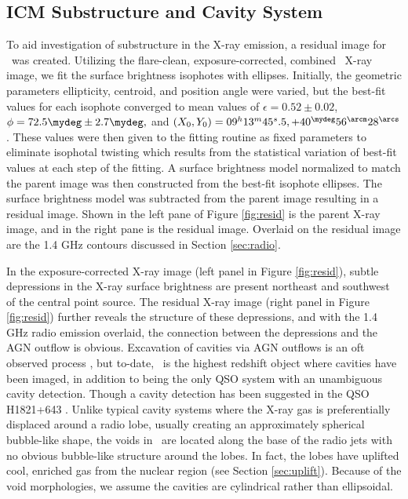 \documentclass{emulateapj}
\begin{document}
\subsection{ICM Substructure and Cavity System}
\label{sec:cavs}

To aid investigation of substructure in the X-ray emission, a residual
image for \iras\ was created. Utilizing the flare-clean,
exposure-corrected, combined \chandra\ X-ray image, we fit the surface
brightness isophotes with ellipses. Initially, the geometric
parameters ellipticity, centroid, and position angle were varied, but
the best-fit values for each isophote converged to mean values of
$\epsilon = 0.52 \pm 0.02$, $\phi = 72.5\mydeg \pm 2.7\mydeg,$ and
$(X_0,Y_0) = \ellradec$. These values were then given to the fitting
routine as fixed parameters to eliminate isophotal twisting which
results from the statistical variation of best-fit values at each step
of the fitting. A surface brightness model normalized to match the
parent image was then constructed from the best-fit isophote
ellipses. The surface brightness model was subtracted from the parent
image resulting in a residual image. Shown in the left pane of Figure
\ref{fig:resid} is the parent X-ray image, and in the right pane is
the residual image. Overlaid on the residual image are the 1.4 GHz
contours discussed in Section \ref{sec:radio}.

In the exposure-corrected X-ray image (left panel in Figure
\ref{fig:resid}), subtle depressions in the X-ray surface brightness
are present northeast and southwest of the central point source. The
residual X-ray image (right panel in Figure \ref{fig:resid}) further
reveals the structure of these depressions, and with the 1.4 GHz radio
emission overlaid, the connection between the depressions and the AGN
outflow is obvious. Excavation of cavities via AGN outflows is an oft
observed process \citep[\eg][]{perseus1, schindler01,
  2003ApJ...596..190M, ms0735, hydraa, 2007ApJ...665.1129K,
  2009ApJ...697L..95B}, but to-date, \iras\ is the highest redshift
object where cavities have been imaged, in addition to being the only
QSO system with an unambiguous cavity detection. Though a cavity
detection has been suggested in the QSO H1821+643
\citep{2009arXiv0911.2339R}. Unlike typical cavity systems where the
X-ray gas is preferentially displaced around a radio lobe, usually
creating an approximately spherical bubble-like shape, the voids in
\iras\ are located along the base of the radio jets with no obvious
bubble-like structure around the lobes. In fact, the lobes have
uplifted cool, enriched gas from the nuclear region (see Section
\ref{sec:uplift}). Because of the void morphologies, we assume the
cavities are cylindrical rather than ellipsoidal.
\end{document}
